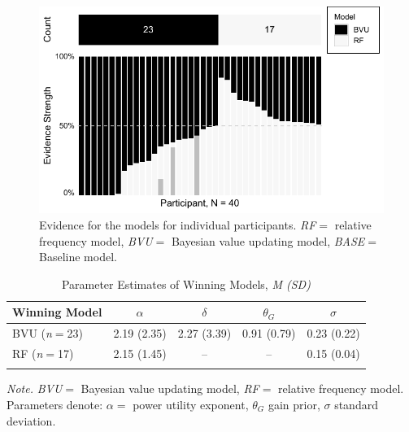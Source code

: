 \documentclass[a4paper, man, floatsintext]{apa6}
\begin{document}
\begin{figure}[htb]

{\centering \includegraphics{../figures/study2_model_weights-1} 

}

\caption{Evidence for the models for individual participants. \textit{RF}$=$ relative frequency model, \textit{BVU}$=$ Bayesian value updating model, \textit{BASE}$=$ Baseline model.}\label{fig:study2_model_weights}
\end{figure}


\begin{table}[tbp]
\begin{center}
\begin{threeparttable}
\caption{\label{tab:study2_parameter}Parameter Estimates of Winning Models, \textit{M (SD)}}
\begin{tabular}{lcccc}
\toprule
Winning Model & $\alpha$ & $\delta$ & $\theta_G$ & $\sigma$\\
\midrule
BVU (\textit{n}$=$23) & 2.19 (2.35) & 2.27 (3.39) & 0.91 (0.79) & 0.23 (0.22)\\
RF (\textit{n}$=$17) & 2.15 (1.45) & -- & -- & 0.15 (0.04)\\
\bottomrule
\addlinespace
\end{tabular}
\begin{tablenotes}[para]
\normalsize{\textit{Note.} \textit{BVU}$=$ Bayesian value updating model, \textit{RF}$=$ relative frequency model. Parameters denote: $\alpha=$ power utility exponent, $\theta_G$ gain prior, $\sigma$ standard deviation.}
\end{tablenotes}
\end{threeparttable}
\end{center}
\end{table}
\end{document}
